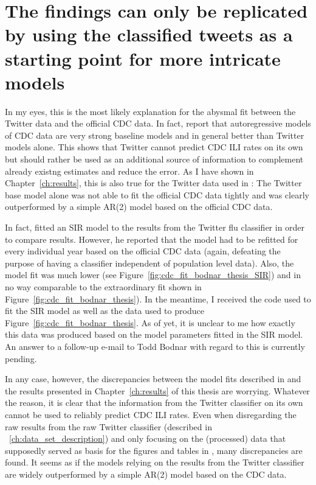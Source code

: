 \documentclass[11pt, a4paper,twoside]{report}\usepackage[]{graphicx}\usepackage[]{color}
\begin{document}
\section{The findings can only be replicated by using the classified tweets as a starting point for more intricate models}
In my eyes, this is the most likely explanation for the abysmal fit between the Twitter data and the official CDC data. In fact, \citep{paul_worldwide_2015} report that autoregressive models of CDC data are very strong baseline models and in general better than Twitter models alone. This shows that Twitter cannot predict CDC ILI rates on its own but should rather be used as an additional source of information to complement already existng estimates and reduce the error. As I have shown in Chapter~\ref{ch:results}, this is also true for the Twitter data used in \citep{bodnar_data_2015}: The Twitter base model alone was not able to fit the official CDC data tightly and was clearly outperformed by a simple AR(2) model based on the official CDC data. 

In fact, \citep{bodnar_data_2015} fitted an SIR model to the results from the Twitter flu classifier in order to compare results. However, he reported that the model had to be refitted for every individual year based on the official CDC data (again, defeating the purpose of having a classifier independent of population level data). Also, the model fit was much lower (see Figure~\ref{fig:cdc_fit_bodnar_thesis_SIR}) and in no way comparable to the extraordinary fit shown in Figure~\ref{fig:cdc_fit_bodnar_thesis}). In the meantime, I received the code used to fit the SIR model as well as the data used to produce Figure~\ref{fig:cdc_fit_bodnar_thesis}. As of yet, it is unclear to me how exactly this data was produced based on the model parameters fitted in the SIR model. An answer to a follow-up e-mail to Todd Bodnar with regard to this is currently pending.

In any case, however, the discrepancies between the model fits described in \citep{bodnar_data_2015} and the results presented in Chapter~\ref{ch:results} of this thesis are worrying. Whatever the reason, it is clear that the information from the Twitter classifier on its own cannot be used to reliably predict CDC ILI rates. Even when disregarding the raw results from the raw Twitter classifier (described in ~\ref{ch:data_set_description}) and only focusing on the (processed) data that supposedly served as basis for the figures and tables in \cite{bodnar_data_2015}, many discrepancies are found. It seems as if the models relying on the results from the Twitter classifier are widely outperformed by a simple AR(2) model based on the CDC data.
\end{document}
